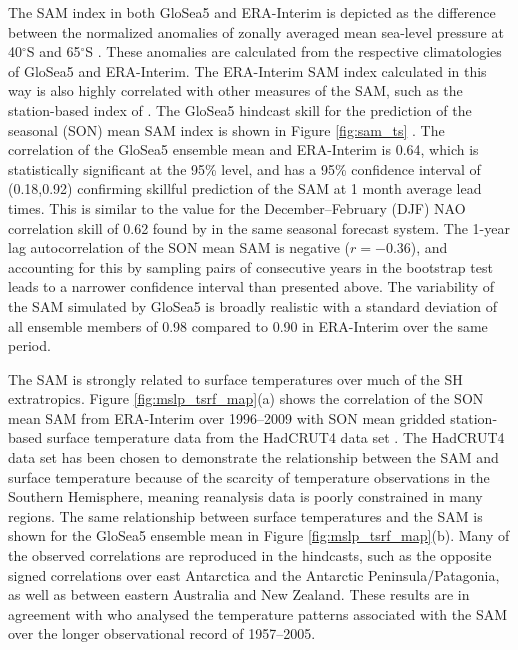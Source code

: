 The SAM index in both GloSea5 and ERA-Interim is depicted as the difference
between the normalized anomalies of zonally averaged mean sea-level pressure at
40$^{\circ}$S and 65$^{\circ}$S \citep{Gong1999}. These anomalies are calculated
from the respective climatologies of GloSea5 and ERA-Interim. The ERA-Interim
SAM index calculated in this way is also highly correlated with other measures
of the SAM, such as the station-based index of \citet{Marshall2003}. The GloSea5
hindcast skill for the prediction of the seasonal (SON) mean SAM index is shown
in Figure \ref{fig:sam_ts} . The correlation of the GloSea5 ensemble mean and
ERA-Interim is 0.64, which is statistically significant at the 95\% level, and
has a 95\% confidence interval of (0.18,0.92) confirming skillful prediction of
the SAM at 1 month average lead times. This is similar to the value for the
December--February (DJF) NAO correlation skill of 0.62 found by
\citet{Scaife2013} in the same seasonal forecast system. The 1-year lag
autocorrelation of the SON mean SAM is negative ($r=-0.36$), and accounting for
this by sampling pairs of consecutive years in the bootstrap test leads to a
narrower confidence interval than presented above. The variability of the SAM
simulated by GloSea5 is broadly realistic with a standard deviation of all
ensemble members of 0.98 compared to 0.90 in ERA-Interim over the same period.

The SAM is strongly related to surface temperatures over much of the SH
extratropics. Figure \ref{fig:mslp_tsrf_map}(a) shows the correlation of the SON
mean SAM from ERA-Interim over 1996--2009 with SON mean gridded station-based
surface temperature data from the HadCRUT4 data set \citep{Morice2012}. The
HadCRUT4 data set has been chosen to demonstrate the relationship between the
SAM and surface temperature because of the scarcity of temperature observations
in the Southern Hemisphere, meaning reanalysis data is poorly constrained in
many regions. The same relationship between surface temperatures and the SAM is
shown for the GloSea5 ensemble mean in Figure \ref{fig:mslp_tsrf_map}(b). Many
of the observed correlations are reproduced in the hindcasts, such as the
opposite signed correlations over east Antarctica and the Antarctic
Peninsula/Patagonia, as well as between eastern Australia and New Zealand. These
results are in agreement with \citet{Gillett2006} who analysed the temperature
patterns associated with the SAM over the longer observational record of
1957--2005.

